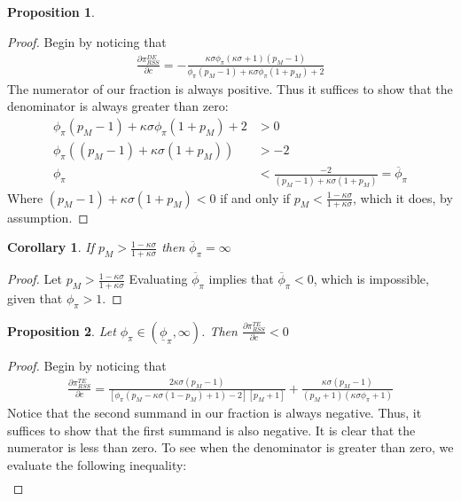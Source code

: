 \documentclass[11pt]{article}
\newtheorem{proposition}{Proposition}
\newtheorem{corollary}{Corollary}[proposition]
\begin{document}
\begin{singlespace}
\begin{proposition}
		\end{proposition} 
		\begin{proof}
			Begin by noticing that 
			\begin{align*}
			\frac{\partial \pi_{RSS}^{DE}}{\partial c} = -\frac{\kappa\sigma\phi_{\pi}(\kappa\sigma+1)(p_M-1)}{\phi_{\pi}(p_M-1) + \kappa\sigma\phi_{\pi}(1+p_M) + 2}
			\end{align*}
			The numerator of our fraction is always positive. Thus it suffices to show that the denominator is always greater than zero:
			\begin{align*}
			\phi_{\pi}(p_M-1) + \kappa\sigma\phi_{\pi}(1+p_M) + 2 &> 0\\
			\phi_{\pi}((p_M-1) + \kappa\sigma(1+p_M)) &> -2\\
			\phi_{\pi} &< \frac{-2}{(p_M-1) + \kappa\sigma(1+p_M)} = \overline{\phi}_{\pi} 	
			\end{align*}
			Where $(p_M-1) + \kappa\sigma(1+p_M)<0$ if and only if $p_M < \frac{1-\kappa\sigma}{1+\kappa\sigma}$, which it does, by assumption. 
		\end{proof}
		\begin{corollary}
			If $p_M > \frac{1-\kappa\sigma}{1+\kappa\sigma}$ then $\overline{\phi}_{\pi} = \infty$
		\end{corollary}
		\begin{proof}
			Let $p_M > \frac{1-\kappa\sigma}{1+\kappa\sigma}$ Evaluating $\overline{\phi}_{\pi}$ implies that $\overline{\phi}_{\pi} < 0$, which is impossible, given that $\phi_{\pi}>1$.
		\end{proof}
		\begin{proposition}\label{prop:pi_tr_neg}
			Let $\phi_{\pi}\in(\underline{\phi}_{\pi},\infty)$. Then $\frac{\partial\pi_{RSS}^{TE}}{\partial c} < 0 $ 
		\end{proposition} 
		\begin{proof}
			Begin by noticing that 
			\begin{align*}
			\frac{\partial \pi_{RSS}^{TE}}{\partial c} = \frac{2\kappa\sigma(p_M-1)}{\left[\phi_{\pi}(p_M - \kappa\sigma(1-p_M) + 1) - 2\right]\left[p_M + 1\right]} + \frac{\kappa\sigma(p_M-1)}{(p_M +1)(\kappa\sigma\phi_{\pi} + 1)}
			\end{align*}
			Notice that the second summand in our fraction is always negative. Thus, it suffices to show that the first summand is also negative. It is clear that the numerator is less than zero. To see when the denominator is greater than zero, we evaluate the following inequality: 
			\begin{align*}

\end{align*}
\end{proof}
\end{singlespace}
\end{document}
